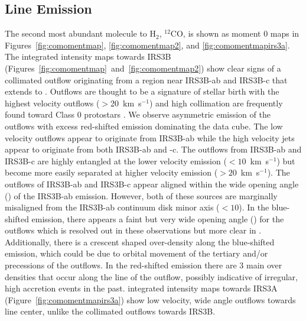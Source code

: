 \subsection{\co\space Line Emission}\label{sec:coemission}
The second most abundant molecule to H$_{2}$, $^{12}$CO, is shown as moment 0 maps in Figures~\ref{fig:comomentmap}, \ref{fig:comomentmap2}, and \ref{fig:comomentmapirs3a}. The \co\space integrated intensity maps towards IRS3B (Figures~\ref{fig:comomentmap}~and~\ref{fig:comomentmap2}) show clear signs of a collimated outflow originating from a region near IRS3B-ab and IRS3B-c that extends to \arcsec. Outflows are thought to be a signature of stellar birth with the highest velocity outflows ($>$20~km~s$^{-1}$) and high collimation are frequently found toward Class 0 protostars \citep[][]{1993ApJ...406..122A}. We observe asymmetric emission of the \co\space outflows with excess red-shifted emission dominating the data cube. The low velocity outflows appear to originate from IRS3B-ab while the high velocity jets appear to originate from both IRS3B-ab and -c. The outflows from IRS3B-ab and IRS3B-c are highly entangled at the lower velocity emission ($<10$~km~s$^{-1}$) but become more easily separated at higher velocity emission ($>20$~km~s$^{-1}$). The outflows of IRS3B-ab and IRS3B-c appear aligned within the wide opening angle (\deg) of the IRS3B-ab emission. However, both of these sources are marginally misaligned from the IRS3B-ab continuum disk minor axis ($<10$\deg). In the blue-shifted emission, there appears a faint but very wide opening angle (\deg) for the outflows which is resolved out in these observations but more clear in \citet{2016Natur.538..483T}. Additionally, there is a crescent shaped over-density along the blue-shifted emission, which could be due to orbital movement of the tertiary and/or precessions of the outflows. In the red-shifted emission there are 3 main over densities that occur along the line of the outflow, possibly indicative of irregular, high accretion events in the past. \co\space integrated intensity maps towards IRS3A (Figure~\ref{fig:comomentmapirs3a}) show low velocity, wide angle outflows towards line center, unlike the collimated outflows towards IRS3B.


